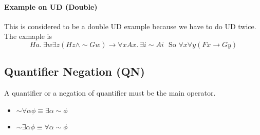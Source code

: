 \documentclass[10pt]{article}
\renewcommand{\implies}{\rightarrow}
\renewcommand{\neg}{\sim}
\begin{document}
\paragraph{Example on UD (Double)}
This is considered to be a double UD example because we have to do UD twice. The exmaple is
\begin{equation*}
    Ha.~\exists w \exists z (Hz \land \neg Gw) \implies \forall x Ax.~\exists i \neg Ai \text{~~So~} \forall x \forall y (Fx \implies Gy)
\end{equation*}


\subsection{Quantifier Negation (QN)}
A quantifier or a negation of quantifier must be the main operator.
\begin{itemize}
    \item $\neg \forall \alpha \phi \equiv \exists \alpha \neg \phi$
    \item $\neg \exists \alpha \phi \equiv \forall \alpha \neg \phi$
\end{itemize}

 
\end{document}
